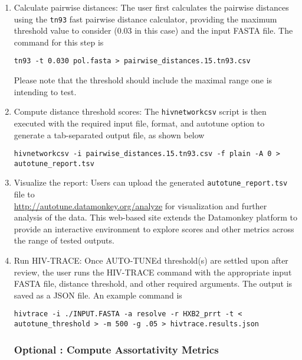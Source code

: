 \documentclass[utf8]{FrontiersinHarvard} %
\begin{document}
\begin{enumerate}

\item{ Calculate pairwise distances: The user first calculates the pairwise distances using the {\tt tn93} fast pairwise distance calculator, providing the maximum threshold value to consider ($0.03$ in this case) and the input FASTA file. The command for this step is 
\begin{lstlisting}[style=BashInputStyle]
 tn93 -t 0.030 pol.fasta > pairwise_distances.15.tn93.csv
\end{lstlisting}

Please note that the threshold should include the maximal range one is intending to test.

}

\item {Compute distance threshold scores: The {\tt hivnetworkcsv} script is then executed with the required input file, format, and autotune option to generate a tab-separated output file, as shown below
\begin{lstlisting}[style=BashInputStyle]
 hivnetworkcsv -i pairwise_distances.15.tn93.csv -f plain -A 0 > autotune_report.tsv
\end{lstlisting}
}

\item {Visualize the report: Users can upload the generated {\tt autotune\_report.tsv} file to \\
  \url{http://autotune.datamonkey.org/analyze} for visualization and further analysis of the data. This web-based site extends the Datamonkey platform \cite{weaver_datamonkey_2018} to provide an interactive environment to explore scores and other metrics across the range of tested outputs. }

\item {Run HIV-TRACE: Once AUTO-TUNEd threshold(s) are settled upon after review, the user runs the HIV-TRACE command with the appropriate input FASTA file, distance threshold, and other required arguments. The output is saved as a JSON file. An example command is
	\begin{lstlisting}[style=BashInputStyle]
hivtrace -i ./INPUT.FASTA -a resolve -r HXB2_prrt -t < autotune_threshold > -m 500 -g .05 > hivtrace.results.json
	\end{lstlisting}
}

\subsubsection{Optional : Compute Assortativity Metrics}


\end{enumerate}
\end{document}
